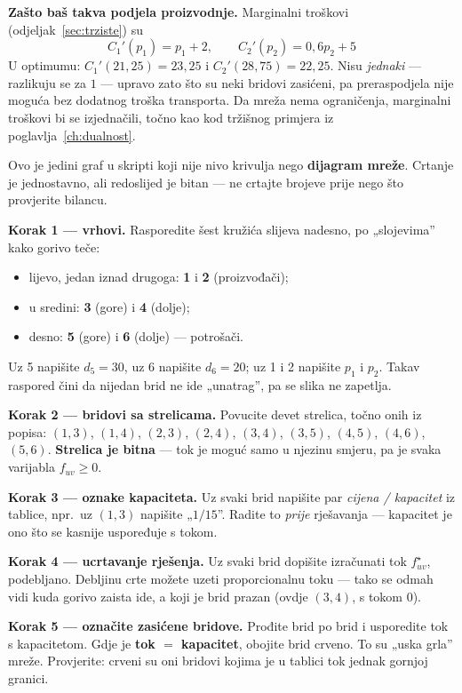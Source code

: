 \begin{zadatak}
\textbf{Zašto baš takva podjela proizvodnje.} Marginalni troškovi
(odjeljak~\ref{sec:trziste}) su
\[
C_1'(p_1) = p_1 + 2, \qquad C_2'(p_2) = 0{,}6p_2 + 5
\]
U optimumu: $C_1'(21{,}25) = 23{,}25$ i $C_2'(28{,}75) = 22{,}25$. Nisu
\emph{jednaki} --- razlikuju se za $1$ --- upravo zato što su neki bridovi
zasićeni, pa preraspodjela nije moguća bez dodatnog troška transporta. Da mreža
nema ograničenja, marginalni troškovi bi se izjednačili, točno kao kod tržišnog
primjera iz poglavlja~\ref{ch:dualnost}.

\begin{crtanje}
Ovo je jedini graf u skripti koji nije nivo krivulja nego \textbf{dijagram
mreže}. Crtanje je jednostavno, ali redoslijed je bitan --- ne crtajte brojeve
prije nego što provjerite bilancu.

\textbf{Korak 1 --- vrhovi.} Rasporedite šest kružića slijeva nadesno, po
„slojevima” kako gorivo teče:
\begin{itemize}
  \item lijevo, jedan iznad drugoga: \textbf{1} i \textbf{2} (proizvođači);
  \item u sredini: \textbf{3} (gore) i \textbf{4} (dolje);
  \item desno: \textbf{5} (gore) i \textbf{6} (dolje) --- potrošači.
\end{itemize}
Uz 5 napišite $d_5 = 30$, uz 6 napišite $d_6 = 20$; uz 1 i 2 napišite $p_1$ i
$p_2$. Takav raspored čini da nijedan brid ne ide „unatrag”, pa se slika ne
zapetlja.

\textbf{Korak 2 --- bridovi sa strelicama.} Povucite devet strelica, točno onih
iz popisa: $(1,3)$, $(1,4)$, $(2,3)$, $(2,4)$, $(3,4)$, $(3,5)$, $(4,5)$,
$(4,6)$, $(5,6)$. \textbf{Strelica je bitna} --- tok je moguć samo u njezinu
smjeru, pa je svaka varijabla $f_{uv} \ge 0$.

\textbf{Korak 3 --- oznake kapaciteta.} Uz svaki brid napišite par
\emph{cijena / kapacitet} iz tablice, npr.\ uz $(1,3)$ napišite „$1 / 15$”.
Radite to \emph{prije} rješavanja --- kapacitet je ono što se kasnije uspoređuje
s tokom.

\textbf{Korak 4 --- ucrtavanje rješenja.} Uz svaki brid dopišite izračunati tok
$f_{uv}^\star$, podebljano. Debljinu crte možete uzeti proporcionalnu toku ---
tako se odmah vidi kuda gorivo zaista ide, a koji je brid prazan (ovdje
$(3,4)$, s tokom $0$).

\textbf{Korak 5 --- označite zasićene bridove.} Prođite brid po brid i
usporedite tok s kapacitetom. Gdje je \textbf{tok $=$ kapacitet}, obojite brid
crveno. To su „uska grla” mreže. Provjerite: crveni su oni bridovi kojima je
u tablici tok jednak gornjoj granici.


\end{crtanje}
\end{zadatak}
